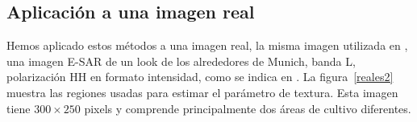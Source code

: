%
%
%
\subsection{Aplicación a una imagen real}

Hemos aplicado estos métodos a una imagen real, la misma imagen utilizada en \citet{APSAR2013ParameterEstimationStochasticDistances}, una imagen E-SAR de un look de los alrededores de Munich, banda L, polarización HH en formato intensidad, como se indica en \citet{Horn1996}. La figura~\ref{reales2} muestra las regiones usadas para estimar el parámetro de textura. Esta imagen tiene $300\times250$ pixels y comprende principalmente dos áreas de cultivo diferentes.

